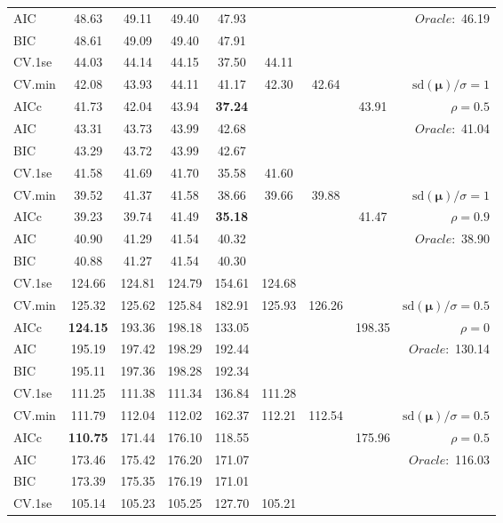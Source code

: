 \begin{table}
\begin{center}
\begin{tabular}{l*{7}{c}|r}
AIC & 48.63 & 49.11 & 49.40 & 47.93 & & & &  \multirow{2}{*}{$Oracle: $ 46.19} \\
BIC & 48.61 & 49.09 & 49.40 & 47.91 & & & &  \\
 \hline 
CV.1se & 44.03 & 44.14 & 44.15 & 37.50 & 44.11 & & & \\
CV.min & 42.08 & 43.93 & 44.11 & 41.17 & 42.30 & 42.64 & & $\mathrm{sd}(\mathbf{\mu})/\sigma=1$ \\
AICc & 41.73 & 42.04 & 43.94 & {\bf 37.24} & & & 43.91 &  $\rho=0.5$ \\
AIC & 43.31 & 43.73 & 43.99 & 42.68 & & & &  \multirow{2}{*}{$Oracle: $ 41.04} \\
BIC & 43.29 & 43.72 & 43.99 & 42.67 & & & &  \\
 \hline 
CV.1se & 41.58 & 41.69 & 41.70 & 35.58 & 41.60 & & & \\
CV.min & 39.52 & 41.37 & 41.58 & 38.66 & 39.66 & 39.88 & & $\mathrm{sd}(\mathbf{\mu})/\sigma=1$ \\
AICc & 39.23 & 39.74 & 41.49 & {\bf 35.18} & & & 41.47 &  $\rho=0.9$ \\
AIC & 40.90 & 41.29 & 41.54 & 40.32 & & & &  \multirow{2}{*}{$Oracle: $ 38.90} \\
BIC & 40.88 & 41.27 & 41.54 & 40.30 & & & &  \\
 \hline 
CV.1se & 124.66 & 124.81 & 124.79 & 154.61 & 124.68 & & & \\
CV.min & 125.32 & 125.62 & 125.84 & 182.91 & 125.93 & 126.26 & & $\mathrm{sd}(\mathbf{\mu})/\sigma=0.5$ \\
AICc & {\bf 124.15} & 193.36 & 198.18 & 133.05 & & & 198.35 &  $\rho=0$ \\
AIC & 195.19 & 197.42 & 198.29 & 192.44 & & & &  \multirow{2}{*}{$Oracle: $ 130.14} \\
BIC & 195.11 & 197.36 & 198.28 & 192.34 & & & &  \\
 \hline 
CV.1se & 111.25 & 111.38 & 111.34 & 136.84 & 111.28 & & & \\
CV.min & 111.79 & 112.04 & 112.02 & 162.37 & 112.21 & 112.54 & & $\mathrm{sd}(\mathbf{\mu})/\sigma=0.5$ \\
AICc & {\bf 110.75} & 171.44 & 176.10 & 118.55 & & & 175.96 &  $\rho=0.5$ \\
AIC & 173.46 & 175.42 & 176.20 & 171.07 & & & &  \multirow{2}{*}{$Oracle: $ 116.03} \\
BIC & 173.39 & 175.35 & 176.19 & 171.01 & & & &  \\
 \hline 
CV.1se & 105.14 & 105.23 & 105.25 & 127.70 & 105.21 & & & \\

\end{tabular}
\end{center}
\end{table}
